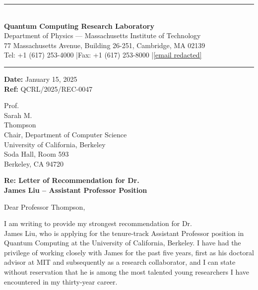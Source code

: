 \documentclass[12pt,a4paper]{article}
\begin{document}
\begin{center}
{\color{headercolor}\rule{\textwidth}{2pt}}\\[12pt]
{\fontsize{20}{24}\selectfont\bfseries\color{headercolor} Quantum Computing Research Laboratory}\\[4pt]
{\large Department of Physics --- Massachusetts Institute of Technology}\\[4pt]
{\small 77 Massachusetts Avenue, Building 26-251, Cambridge, MA 02139}\\[2pt]
{\small Tel: +1 (617) 253-4000 \quad|\quad Fax: +1 (617) 253-8000 \quad|\quad \href{mailto:[email redacted]}{[email redacted]}}\\[8pt]
{\color{headercolor}\rule{\textwidth}{0.5pt}}
\end{center}

\vspace{1cm}

\begin{flushright}
\textbf{Date:} January 15, 2025\\
\textbf{Ref:} QCRL/2025/REC-0047
\end{flushright}

\vspace{0.5cm}

Prof.\\ Sarah M.\\ Thompson\\
Chair, Department of Computer Science\\
University of California, Berkeley\\
Soda Hall, Room 593\\
Berkeley, CA 94720

\vspace{0.5cm}

\textbf{Re: Letter of Recommendation for Dr.\\ James Liu -- Assistant Professor Position}

\vspace{0.3cm}

Dear Professor Thompson,

I am writing to provide my strongest recommendation for Dr.\\ James Liu, who is applying for the tenure-track Assistant Professor position in Quantum Computing at the University of California, Berkeley. I have had the privilege of working closely with James for the past five years, first as his doctoral advisor at MIT and subsequently as a research collaborator, and I can state without reservation that he is among the most talented young researchers I have encountered in my thirty-year career.
\end{document}
